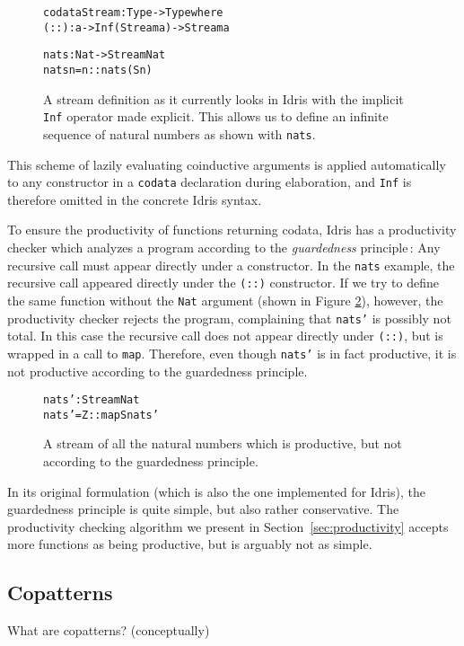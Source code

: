 \begin{figure}
\begin{alltt}
codata Stream : Type -> Type where
  (::) : a -> Inf (Stream a) -> Stream a

nats : Nat -> Stream Nat
nats n = n :: nats (S n)
\end{alltt}
\caption{A stream definition as it currently looks in Idris with the implicit \texttt{Inf} operator made explicit. This allows us to define an infinite sequence of natural numbers as shown with \texttt{nats}.}
\label{fig:stream_current_Inf_and_nats}
\end{figure}

This scheme of lazily evaluating coinductive arguments is applied automatically to any constructor in a \texttt{codata} declaration during elaboration, and \texttt{Inf} is therefore omitted in the concrete Idris syntax.

To ensure the productivity of functions returning codata, Idris has a productivity checker which analyzes a program according to the \emph{guardedness} principle\,\citep{Coquand94,Gimenez95}: Any recursive call must appear directly under a constructor. In the \texttt{nats} example, the recursive call appeared directly under the \texttt{(::)} constructor. If we try to define the same function without the \texttt{Nat} argument (shown in Figure \ref{fig:nats'}), however, the productivity checker rejects the program, complaining that \texttt{nats'} is possibly not total. In this case the recursive call does not appear directly under \texttt{(::)}, but is wrapped in a call to \texttt{map}. Therefore, even though \texttt{nats'} is in fact productive, it is not productive according to the guardedness principle.

\begin{figure}
\begin{alltt}
nats' : Stream Nat
nats' = Z :: map S nats'
\end{alltt}
\caption{A stream of all the natural numbers which is productive, but not according to the guardedness principle.}
\label{fig:nats'}
\end{figure}

In its original formulation (which is also the one implemented for Idris), the guardedness principle is quite simple, but also rather conservative. The productivity checking algorithm we present in Section~\ref{sec:productivity} accepts more functions as being productive, but is arguably not as simple.

\subsection{Copatterns}
What are copatterns? (conceptually)

